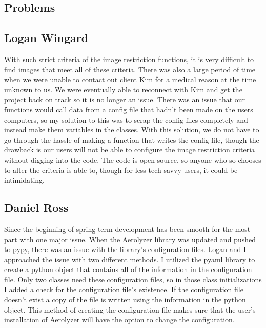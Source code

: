\documentclass[onecolumn, draftclsnofoot,10pt, compsoc]{IEEEtran}
\begin{document}
\begin{singlespace}
	\section{Problems}
		
		\subsection{Logan Wingard}
			With such strict criteria of the image restriction functions, it is very difficult to find images that meet all of these criteria.
			There was also a large period of time when we were unable to contact out client Kim for a medical reason at the time unknown to us.
			We were eventually able to reconnect with Kim and get the project back on track so it is no longer an issue.
			There was an issue that our functions would call data from a config file that hadn't been made on the users computers, so my solution to this was to scrap the config files completely and instead make them variables in the classes.
			With this solution, we do not have to go through the hassle of making a function that writes the config file, though the drawback is our users will not be able to configure the image restriction criteria without digging into the code.
			The code is open source, so anyone who so chooses to alter the criteria is able to, though for less tech savvy users, it could be intimidating. 
		\subsection{Daniel Ross}
			Since the beginning of spring term development has been smooth for the most part with one major issue.
			When the Aerolyzer library was updated and pushed to pypy, there was an issue with the library's configuration files.
			Logan and I approached the issue with two different methods.
			I utilized the pyaml library to create a python object that contains all of the information in the configuration file.
			Only two classes need these configuration files, so in those class initializations I added a check for the configuration file's existence.
			If the configuration file doesn't exist a copy of the file is written using the information in the python object.
			This method of creating the configuration file makes sure that the user's installation of Aerolyzer will have the option to change the configuration.
			

\end{singlespace}
\end{document}
